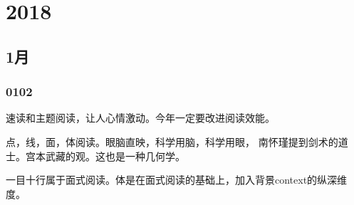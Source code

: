 \chapter{2018}

\section{1月}

\subsection{0102}

速读和主题阅读，让人心情激动。今年一定要改进阅读效能。

点，线，面，体阅读。眼脑直映，科学用脑，科学用眼，
南怀瑾提到剑术的道士。宫本武藏的观。这也是一种几何学。

一目十行属于面式阅读。体是在面式阅读的基础上，加入背景context的纵深维度。
